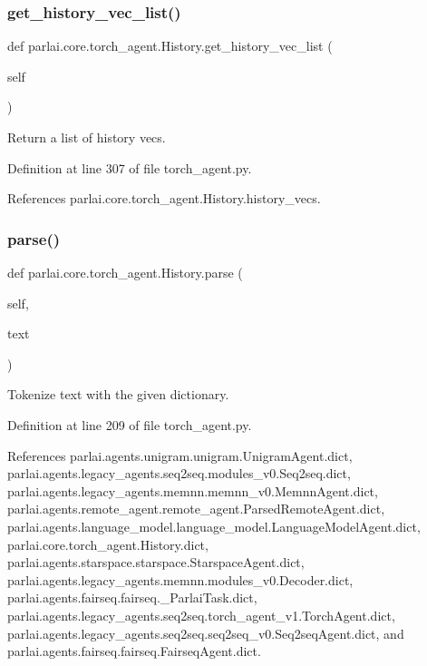 \subsubsection{\texorpdfstring{get\+\_\+history\+\_\+vec\+\_\+list()}{get\_history\_vec\_list()}}
{\footnotesize\ttfamily def parlai.\+core.\+torch\+\_\+agent.\+History.\+get\+\_\+history\+\_\+vec\+\_\+list (\begin{DoxyParamCaption}\item[{}]{self }\end{DoxyParamCaption})}

\begin{DoxyVerb}Return a list of history vecs.\end{DoxyVerb}
 

Definition at line 307 of file torch\+\_\+agent.\+py.



References parlai.\+core.\+torch\+\_\+agent.\+History.\+history\+\_\+vecs.

\mbox{\label{classparlai_1_1core_1_1torch__agent_1_1History_a7758c7e9d42442ac228b820be4298d84}} 
\subsubsection{\texorpdfstring{parse()}{parse()}}
{\footnotesize\ttfamily def parlai.\+core.\+torch\+\_\+agent.\+History.\+parse (\begin{DoxyParamCaption}\item[{}]{self,  }\item[{}]{text }\end{DoxyParamCaption})}

\begin{DoxyVerb}Tokenize text with the given dictionary.\end{DoxyVerb}
 

Definition at line 209 of file torch\+\_\+agent.\+py.



References parlai.\+agents.\+unigram.\+unigram.\+Unigram\+Agent.\+dict, parlai.\+agents.\+legacy\+\_\+agents.\+seq2seq.\+modules\+\_\+v0.\+Seq2seq.\+dict, parlai.\+agents.\+legacy\+\_\+agents.\+memnn.\+memnn\+\_\+v0.\+Memnn\+Agent.\+dict, parlai.\+agents.\+remote\+\_\+agent.\+remote\+\_\+agent.\+Parsed\+Remote\+Agent.\+dict, parlai.\+agents.\+language\+\_\+model.\+language\+\_\+model.\+Language\+Model\+Agent.\+dict, parlai.\+core.\+torch\+\_\+agent.\+History.\+dict, parlai.\+agents.\+starspace.\+starspace.\+Starspace\+Agent.\+dict, parlai.\+agents.\+legacy\+\_\+agents.\+memnn.\+modules\+\_\+v0.\+Decoder.\+dict, parlai.\+agents.\+fairseq.\+fairseq.\+\_\+\+Parlai\+Task.\+dict, parlai.\+agents.\+legacy\+\_\+agents.\+seq2seq.\+torch\+\_\+agent\+\_\+v1.\+Torch\+Agent.\+dict, parlai.\+agents.\+legacy\+\_\+agents.\+seq2seq.\+seq2seq\+\_\+v0.\+Seq2seq\+Agent.\+dict, and parlai.\+agents.\+fairseq.\+fairseq.\+Fairseq\+Agent.\+dict.



